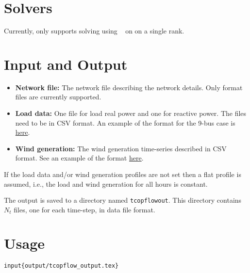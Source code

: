\section{Solvers}\label{sec:tcopflow_solvers}%
Currently, \exago only supports solving \tcopflow using \ipopt~ on on a single rank. %

\section{Input and Output}
\begin{itemize}
    \item \textbf{Network file:} The network file describing the network details. Only \matpower format files are currently supported.
    \item \textbf{Load data:} One file for load real power and one for reactive power. The files need to be in CSV format. An example of the format for the 9-bus case is \href{https://gitlab.pnnl.gov/exasgd/frameworks/exago/-/tree/master/datafiles/case9}{here}.
    \item \textbf{Wind generation:} The wind generation time-series described in CSV format. See an example of the format \href{https://gitlab.pnnl.gov/exasgd/frameworks/exago/-/tree/master/datafiles/case9}{here}.
\end{itemize}
If the load data and/or wind generation profiles are not set then a flat profile is assumed, i.e., the load and wind generation for all hours is constant.

The \tcopflow output is saved to a directory named \texttt{tcopflowout}. This directory contains $N_t$ files, one for each time-step, in \matpower data file format.

\section{Usage}
\begin{lstlisting}
input{output/tcopflow_output.tex}
\end{lstlisting}

